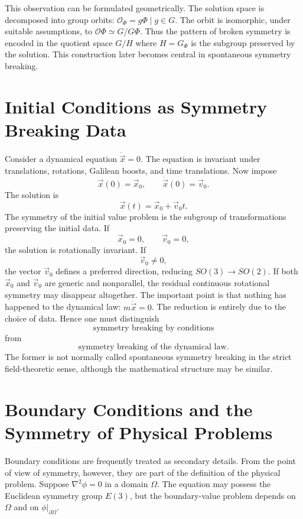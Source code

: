 This observation can be formulated geometrically.  The solution space is
decomposed into group orbits: $\mathcal{O}_\Phi={g\Phi\mid g\in G}$.
The orbit is isomorphic, under suitable assumptions, to
$\mathcal{O} \Phi\simeq G/G \Phi$.
Thus the pattern of broken symmetry is encoded in the quotient space
$G/H$ where $H=G_\Phi$ is the subgroup preserved by the solution.
This construction later becomes central in spontaneous symmetry breaking.

\section{ Initial Conditions as Symmetry Breaking Data}
\label{sp:ic}

Consider a dynamical equation $\ddot{\vec{x}}=0$.
The equation is invariant under translations, rotations, Galilean boosts, and
time translations. Now impose
\[\vec{x}(0)=\vec{x}_0,\qquad\dot{\vec{x}}(0)=\vec{v}_0.\]
The solution is
\[\vec{x}(t)=\vec{x}_0+\vec{v}_0t.\]
The symmetry of the initial value problem is the subgroup of transformations
preserving the initial data.
If
\[\vec{x}_0=0,\qquad\vec{v}_0=0,\]
the solution is rotationally invariant.
If
\[\vec{v}_0\neq0,\]
the vector $\vec{v}_0$ defines a preferred direction, reducing
$SO(3)\rightarrow SO(2)$.
If both $\vec{x}_0$ and $\vec{v}_0$ are generic and nonparallel, the residual 
continuous rotational symmetry may disappear altogether.
The important point is that nothing has happened to the dynamical law:
$m\ddot{\vec{x}}=0$.
The reduction is entirely due to the choice of data.
Hence one must distinguish
\[\boxed{\text{symmetry breaking by conditions}}\]
from
\[\boxed{\text{symmetry breaking of the dynamical law}.}\]
The former is not normally called spontaneous symmetry breaking in the strict
field-theoretic sense, although the mathematical structure may be similar.

\section{Boundary Conditions and the Symmetry of Physical Problems}
\label{sp:bc}

Boundary conditions are frequently treated as secondary details.  From the
point of view of symmetry, however, they are part of the definition of the
physical problem.
Suppose $\nabla^2\phi=0$ in a domain $\Omega$.
The equation may possess the Euclidean symmetry group $E(3)$, but the
boundary-value problem depends on $\Omega$ and on $\phi|_{\partial\Omega}$.

